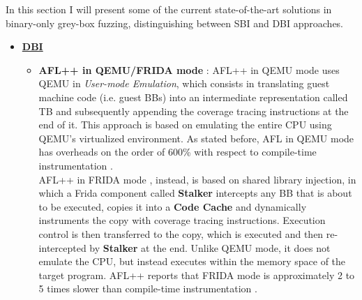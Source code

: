 In this section I will present some of the current state-of-the-art solutions in binary-only grey-box fuzzing,
    distinguishing between \gls{SBI} and \gls{DBI} approaches.

    \begin{itemize}
        \item \underline{\textbf{\gls{DBI}}}
        \begin{itemize}
            \item \textbf{AFL++ in QEMU/FRIDA mode} \cite{aflplusplus}: AFL++ in QEMU mode uses QEMU in \textit{User-mode Emulation},
                which consists in translating guest machine code (i.e. guest \gls{BB}s) into an intermediate representation
                called \gls{TB} and subsequently appending the coverage tracing instructions at the end of it.
                This approach is based on emulating the entire CPU using QEMU's virtualized environment. As stated before,
                AFL in QEMU mode has overheads on the order of 600\% with respect to compile-time instrumentation \cite{zafl}.\\
                AFL++ in FRIDA mode \cite{aflplusplus-frida-mode}, instead, is based on shared library injection, in which a Frida \cite{frida} component
                called \textbf{Stalker} intercepts any \gls{BB} that is about to be executed, copies it into a \textbf{Code Cache}
                and dynamically instruments the copy with coverage tracing instructions.
                Execution control is then transferred to the copy, which is executed and then re-intercepted by \textbf{Stalker} at the end.
                Unlike QEMU mode, it does not emulate the CPU, but instead executes within the memory space of the target program.
                AFL++ reports that FRIDA mode is approximately 2 to 5 times slower than compile-time instrumentation \cite{aflplusplus_binary_only_targets}.


\end{itemize}
\end{itemize}
